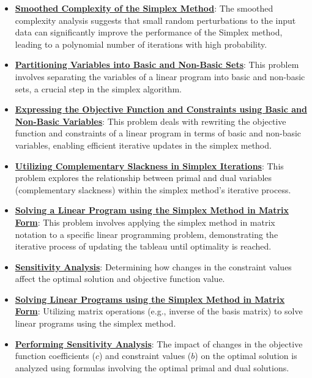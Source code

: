 \documentclass{article}%
\begin{document}
\begin{itemize}[leftmargin=*]
\item \href{https://www.math.purdue.edu/~yipn/421/2024-09-05-SimplexEfficiency.pdf#page=11}{\textbf{Smoothed Complexity of the Simplex Method}}: The smoothed complexity analysis suggests that small random perturbations to the input data can significantly improve the performance of the Simplex method, leading to a polynomial number of iterations with high probability.%
\item \href{https://www.math.purdue.edu/~yipn/421/2024-09-24-SimplexMatrix.pdf#page=4}{\textbf{Partitioning Variables into Basic and Non-Basic Sets}}: This problem involves separating the variables of a linear program into basic and non-basic sets, a crucial step in the simplex algorithm.%
\item \href{https://www.math.purdue.edu/~yipn/421/2024-09-24-SimplexMatrix.pdf#page=8}{\textbf{Expressing the Objective Function and Constraints using Basic and Non-Basic Variables}}: This problem deals with rewriting the objective function and constraints of a linear program in terms of basic and non-basic variables, enabling efficient iterative updates in the simplex method.%
\item \href{https://www.math.purdue.edu/~yipn/421/2024-09-24-SimplexMatrix.pdf#page=14}{\textbf{Utilizing Complementary Slackness in Simplex Iterations}}: This problem explores the relationship between primal and dual variables (complementary slackness) within the simplex method's iterative process.%
\item \href{https://www.math.purdue.edu/~yipn/421/2024-09-24-SimplexMatrix.pdf#page=15}{\textbf{Solving a Linear Program using the Simplex Method in Matrix Form}}: This problem involves applying the simplex method in matrix notation to a specific linear programming problem, demonstrating the iterative process of updating the tableau until optimality is reached.%
\item \href{https://www.math.purdue.edu/~yipn/421/2024-10-01-SensitivityDuality.pdf#page=1}{\textbf{Sensitivity Analysis}}: Determining how changes in the constraint values affect the optimal solution and objective function value.%
\item \href{https://www.math.purdue.edu/~yipn/421/2024-10-01-SensitivityDuality.pdf#page=4}{\textbf{Solving Linear Programs using the Simplex Method in Matrix Form}}: Utilizing matrix operations (e.g., inverse of the basis matrix) to solve linear programs using the simplex method.%
\item \href{https://www.math.purdue.edu/~yipn/421/2024-12-03-Duality.pdf#page=11}{\textbf{Performing Sensitivity Analysis}}: The impact of changes in the objective function coefficients ($c$) and constraint values ($b$) on the optimal solution is analyzed using formulas involving the optimal primal and dual solutions.%

\end{itemize}
\end{document}
